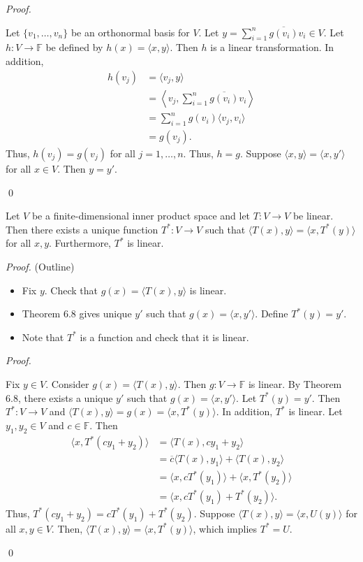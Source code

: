 \documentclass[12pt]{article}
\newenvironment{theorem}[2][Theorem]{\begin{trivlist}
\item[\hskip \labelsep {\bfseries #1}\hskip \labelsep {\bfseries #2.}]}{\end{trivlist}}
\newenvironment{sol}
    {\emph{Proof.}
    }
    {
    \qed
    }
\begin{document}
\begin{sol}
Let $\{v_1, \dots, v_n\}$ be an orthonormal basis for $V$. Let $y = \sum_{i = 1}^n\overline{g(v_i)}v_i \in V$. Let $h : V \to \mathbb{F}$ be defined by $h(x) = \langle x, y \rangle$. Then $h$ is a linear transformation. In addition, \begin{align*}
    h(v_j) &= \langle v_j, y \rangle \\
    &= \left\langle v_j, \sum_{i = 1}^n\overline{g(v_i)}v_i \right\rangle \\
    &= \sum_{i=1}^ng(v_i) \langle v_j, v_i \rangle \\
    &= g(v_j).
\end{align*} Thus, $h(v_j) = g(v_j)$ for all $j = 1, \dots, n$. Thus, $h = g$. Suppose $\langle x, y \rangle = \langle x, y' \rangle$ for all $x \in V$. Then $y = y'$.
\end{sol}

\begin{theorem}{6.9}
Let $V$ be a finite-dimensional inner product space and let $T : V \to V$ be linear. Then there exists a unique function $T^* : V \to V$ such that $\langle T(x), y \rangle = \langle x, T^*(y) \rangle$ for all $x,y$. Furthermore, $T^*$ is linear.
\end{theorem}

\textit{Proof.} (Outline)

\begin{itemize}
    \item Fix $y$. Check that $g(x) = \langle T(x), y \rangle$ is linear.
    
    \item Theorem 6.8 gives unique $y'$ such that $g(x) = \langle x, y' \rangle$. Define $T^*(y) = y'$.
    
    \item Note that $T^*$ is a function and check that it is linear.
\end{itemize}

\begin{sol}
Fix $y \in V$. Consider $g(x) = \langle T(x), y \rangle$. Then $g : V \to \mathbb{F}$ is linear. By Theorem 6.8, there exists a unique $y'$ such that $g(x) = \langle x, y' \rangle$. Let $T^*(y) = y'$. Then $T^* : V \to V$ and $\langle T(x), y \rangle = g(x) = \langle x, T^*(y) \rangle$. In addition, $T^*$ is linear. Let $y_1, y_2 \in V$ and $c \in \mathbb{F}$. Then \begin{align*}
    \langle x, T^*(cy_1 + y_2) \rangle &= \langle T(x), cy_1 + y_2 \rangle \\
    &= \overline{c} \langle T(x), y_1 \rangle + \langle T(x), y_2 \rangle \\
    &= \langle x, cT^*(y_1) \rangle + \langle x, T^*(y_2) \rangle \\ 
    &= \langle x, cT^*(y_1) + T^*(y_2) \rangle.
\end{align*} Thus, $T^*(cy_1 + y_2) = cT^*(y_1) + T^*(y_2)$. Suppose $\langle T(x), y \rangle = \langle x, U(y) \rangle$ for all $x,y \in V$. Then, $\langle T(x), y \rangle = \langle x, T^*(y) \rangle$, which implies $T^* = U$.
\end{sol}
\end{document}
